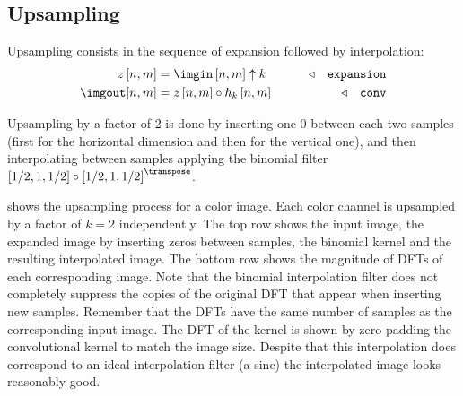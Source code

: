 \subsection{Upsampling}

Upsampling consists in the sequence of expansion followed by interpolation:
\begin{align}
    z \left[n,m\right] &= \imgin \left[n,m\right] \uparrow k 
  & \quad\quad \triangleleft \quad \texttt{expansion}\\
    \imgout [n,m] &= z \left[n,m\right] \circ h_k \left[n,m\right]  & \quad\quad \triangleleft \quad \texttt{conv}
\end{align}



Upsampling by a factor of 2 is done by inserting one 0 between each two samples (first for the horizontal dimension and then for the vertical one), and then interpolating between samples applying the binomial filter $\left[1/2,1,1/2\right] \circ \left[1/2,1,1/2\right]^\transpose$. 

\Fig{\ref{fig:upsamplingazebra}} shows the upsampling process for a color image. Each color channel is upsampled by a factor of $k=2$ independently. The top row shows the input image, the expanded image by inserting zeros between samples, the binomial kernel and the resulting interpolated image. The bottom row shows the magnitude of DFTs of each corresponding image. Note that the binomial interpolation filter does not completely suppress  the copies of the original DFT that appear when inserting new samples. Remember that the DFTs have the same number of samples as the corresponding input image. The DFT of the kernel is shown by zero padding the convolutional kernel to match the image size. Despite that this interpolation does correspond to an ideal interpolation filter (a sinc) the interpolated image looks reasonably good.



